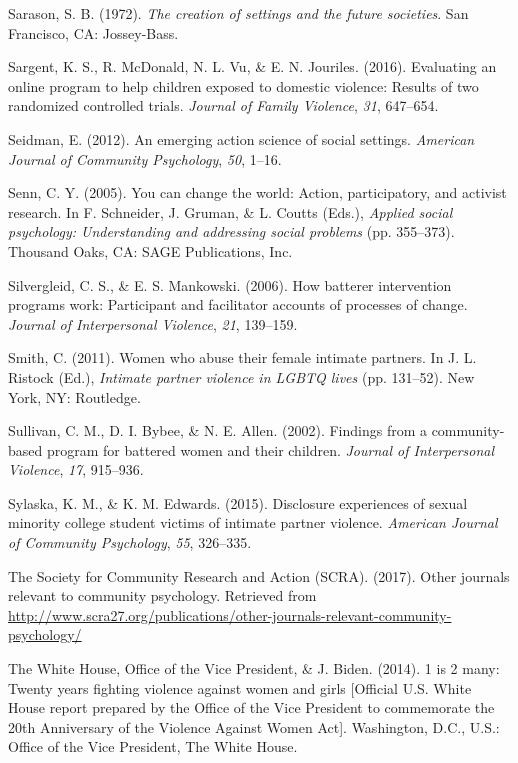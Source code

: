 \documentclass[11pt,]{tufte-book}
\begin{document}
\hypertarget{ref-sarason1972creation}{}
Sarason, S. B. (1972). \emph{The creation of settings and the future
societies}. San Francisco, CA: Jossey-Bass.

\hypertarget{ref-sargent2016evaluating}{}
Sargent, K. S., R. McDonald, N. L. Vu, \& E. N. Jouriles. (2016).
Evaluating an online program to help children exposed to domestic
violence: Results of two randomized controlled trials. \emph{Journal of
Family Violence}, \emph{31}, 647--654.

\hypertarget{ref-seidman2012emerging}{}
Seidman, E. (2012). An emerging action science of social settings.
\emph{American Journal of Community Psychology}, \emph{50}, 1--16.

\hypertarget{ref-senn2005you}{}
Senn, C. Y. (2005). You can change the world: Action, participatory, and
activist research. In F. Schneider, J. Gruman, \& L. Coutts (Eds.),
\emph{Applied social psychology: Understanding and addressing social
problems} (pp. 355--373). Thousand Oaks, CA: SAGE Publications, Inc.

\hypertarget{ref-silvergleid2006batterer}{}
Silvergleid, C. S., \& E. S. Mankowski. (2006). How batterer
intervention programs work: Participant and facilitator accounts of
processes of change. \emph{Journal of Interpersonal Violence},
\emph{21}, 139--159.

\hypertarget{ref-smith2011women}{}
Smith, C. (2011). Women who abuse their female intimate partners. In J.
L. Ristock (Ed.), \emph{Intimate partner violence in LGBTQ lives} (pp.
131--52). New York, NY: Routledge.

\hypertarget{ref-sullivan2002findings}{}
Sullivan, C. M., D. I. Bybee, \& N. E. Allen. (2002). Findings from a
community-based program for battered women and their children.
\emph{Journal of Interpersonal Violence}, \emph{17}, 915--936.

\hypertarget{ref-sylaska2015disclosure}{}
Sylaska, K. M., \& K. M. Edwards. (2015). Disclosure experiences of
sexual minority college student victims of intimate partner violence.
\emph{American Journal of Community Psychology}, \emph{55}, 326--335.

\hypertarget{ref-scra2017other}{}
The Society for Community Research and Action (SCRA). (2017). Other
journals relevant to community psychology. Retrieved from
\url{http://www.scra27.org/publications/other-journals-relevant-community-psychology/}

\hypertarget{ref-biden2014twenty}{}
The White House, Office of the Vice President, \& J. Biden. (2014). 1 is
2 many: Twenty years fighting violence against women and girls
{[}Official U.S. White House report prepared by the Office of the Vice
President to commemorate the 20th Anniversary of the Violence Against
Women Act{]}. Washington, D.C., U.S.: Office of the Vice President, The
White House.
\end{document}
